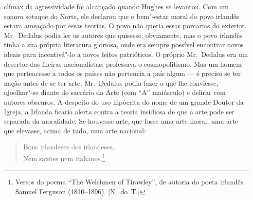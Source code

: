 clímax da agressividade foi alcançado quando Hughes se levantou.  Com um sonoro
sotaque do Norte, ele declarou que o bem"-estar moral do povo irlandês estava
\label{ameacado"-por} ameaçado por essas teorias.  O povo não queria essas porcarias do
exterior.  Mr.~Dedalus podia ler os autores que quisesse, obviamente, mas o
povo irlandês tinha a sua própria literatura gloriosa, onde era sempre possível
encontrar novos ideais para incentivá"-lo a novos feitos patrióticos.  O próprio
Mr.~Dedalus era um desertor das fileiras nacionalistas: professava o
cosmopolitismo.  Mas um homem que pertencesse a todos os países não pertencia a
país algum --- é preciso se ter nação antes de se ter arte.  Mr.~Dedalus podia
fazer o que lhe conviesse, ajoelhar"-se diante do sacrário da Arte (com “A”
maiúsculo) e delirar com autores obscuros.  A despeito do uso hipócrita do nome
de um grande Doutor da Igreja, a Irlanda ficaria alerta contra a teoria
insidiosa de que a arte pode ser separada da moralidade.  Se houvesse arte, que
fosse uma arte moral, uma arte que elevasse, acima de tudo, uma arte nacional:

\begin{verse}
Bons irlandeses dos irlandeses,\\
Nem saxões nem italianos.\footnote{ Versos do poema “The Welshmen of Tirawley”,
de autoria do poeta irlandês Samuel Ferguson (1810--1896). [N.~do~T.]}
\end{verse}

